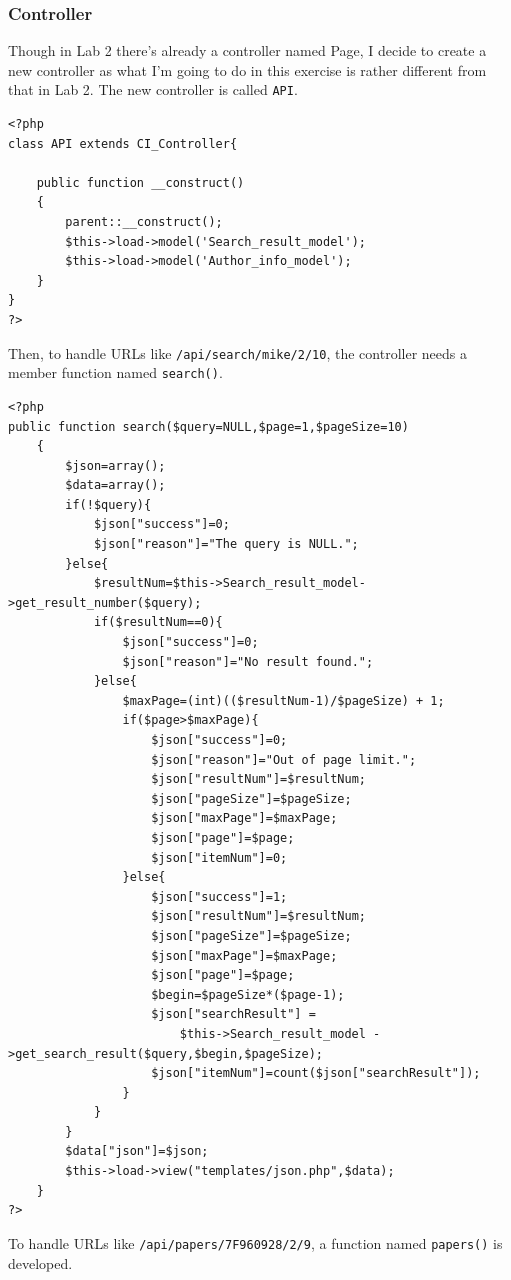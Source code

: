 \documentclass[a4paper]{article}
\begin{document}
            \subsubsection{Controller} 
Though in Lab 2 there's already a controller named Page, I decide to create a new controller as what I'm going to do in this exercise is rather different from that in Lab 2. The new controller is called \texttt{API}.
\begin{verbatim}
<?php 
class API extends CI_Controller{

    public function __construct()
    {
        parent::__construct();
        $this->load->model('Search_result_model');
        $this->load->model('Author_info_model');
    }
}
?>    
\end{verbatim}
Then, to handle URLs like \texttt{/api/search/mike/2/10}, the controller needs a member function named \texttt{search()}. 
\begin{verbatim}
<?php
public function search($query=NULL,$page=1,$pageSize=10)
    {
        $json=array();
        $data=array();
        if(!$query){
            $json["success"]=0;
            $json["reason"]="The query is NULL.";
        }else{
            $resultNum=$this->Search_result_model->get_result_number($query);
            if($resultNum==0){
                $json["success"]=0;
                $json["reason"]="No result found.";
            }else{
                $maxPage=(int)(($resultNum-1)/$pageSize) + 1;
                if($page>$maxPage){
                    $json["success"]=0;
                    $json["reason"]="Out of page limit.";
                    $json["resultNum"]=$resultNum;
                    $json["pageSize"]=$pageSize;
                    $json["maxPage"]=$maxPage;
                    $json["page"]=$page;
                    $json["itemNum"]=0;
                }else{
                    $json["success"]=1;
                    $json["resultNum"]=$resultNum;
                    $json["pageSize"]=$pageSize;
                    $json["maxPage"]=$maxPage;
                    $json["page"]=$page;
                    $begin=$pageSize*($page-1);
                    $json["searchResult"] = 
                        $this->Search_result_model ->get_search_result($query,$begin,$pageSize);
                    $json["itemNum"]=count($json["searchResult"]);
                }
            }
        }
        $data["json"]=$json;
        $this->load->view("templates/json.php",$data);
    }
?>
\end{verbatim}
To handle URLs like \texttt{/api/papers/7F960928/2/9}, a function named \texttt{papers()} is developed.
\end{document}
